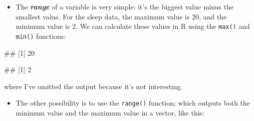 \documentclass[
]{book}
\newenvironment{Shaded}{\begin{snugshade}}{\end{snugshade}}
\newcommand{\FunctionTok}[1]{\textcolor[rgb]{0.13,0.29,0.53}{\textbf{#1}}}
\newcommand{\NormalTok}[1]{#1}
\newcommand{\SpecialCharTok}[1]{\textcolor[rgb]{0.81,0.36,0.00}{\textbf{#1}}}
\providecommand{\tightlist}{%
  \setlength{\itemsep}{0pt}\setlength{\parskip}{0pt}}
\begin{document}
\begin{itemize}
\tightlist
\item
  The \textbf{\emph{range}} of a variable is very simple: it's the biggest value minus the smallest value. For the sleep data, the maximum value is 20, and the minimum value is 2. We can calculate these values in R using the \texttt{max()} and \texttt{min()} functions:
\end{itemize}

\begin{Shaded}
\end{Shaded}

\begin{Shaded}
\begin{Highlighting}[]
\NormalTok{\#\# [1] 20}
\end{Highlighting}
\end{Shaded}

\begin{Shaded}
\end{Shaded}

\begin{Shaded}
\begin{Highlighting}[]
\NormalTok{\#\# [1] 2}
\end{Highlighting}
\end{Shaded}

where I've omitted the output because it's not interesting.

\begin{itemize}
\tightlist
\item
  The other possibility is to use the \texttt{range()} function; which outputs both the minimum value and the maximum value in a vector, like this:
\end{itemize}

\begin{Shaded}
\end{Shaded}
\end{document}
